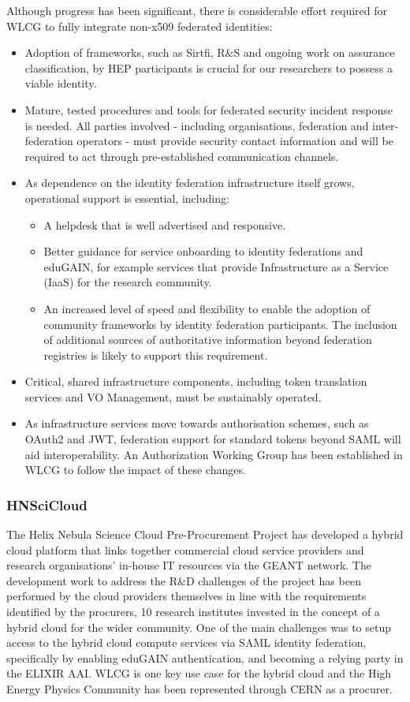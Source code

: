 \documentclass[fleqn,10pt]{wlscirep}
\begin{document}
{Although progress has been significant, there is considerable effort required for WLCG to fully integrate non-x509 federated identities:
\begin{itemize}
\item Adoption of frameworks, such as Sirtfi, R\&S and ongoing work on assurance classification, by HEP participants is crucial for our researchers to possess a viable identity. 
\item Mature, tested procedures and tools for federated security incident response is needed. All parties involved - including organisations, federation and inter-federation operators - must provide security contact information and will be required to act through pre-established communication channels.
\item As dependence on the identity federation infrastructure itself grows, operational support is essential, including:
\begin{itemize}
\item A helpdesk that is well advertised and responsive.
\item Better guidance for service onboarding to identity federations and eduGAIN, for example services that provide Infrastructure as a Service (IaaS) for the research community.
\item An increased level of speed and flexibility to enable the adoption of community frameworks by identity federation participants. The inclusion of additional sources of authoritative information beyond federation registries is likely to support this requirement.
\end{itemize}
\item Critical, shared infrastructure components, including token translation services and VO Management, must be sustainably operated.
\item As infrastructure services move towards authorisation schemes, such as OAuth2 and JWT, federation support for standard tokens beyond SAML will aid interoperability. An Authorization Working Group has been established in WLCG to follow the impact of these changes.

\end{itemize}

\subsubsection{HNSciCloud}
The Helix Nebula Science Cloud Pre-Procurement Project\cite{hnscicloud} has developed a hybrid cloud platform that links together commercial cloud service providers and research organisations’ in-house IT resources via the GEANT network. The development work to address the R\&D challenges of the project has been performed by the cloud providers themselves in line with the requirements identified by the procurers, 10 research institutes invested in the concept of a hybrid cloud for the wider community. One of the main challenges was to setup access to the hybrid cloud compute services via SAML identity federation, specifically by enabling eduGAIN authentication, and becoming a relying party in the ELIXIR AAI. WLCG is one key use case for the hybrid cloud and the High Energy Physics Community has been represented through CERN as a procurer. 

}
\end{document}
